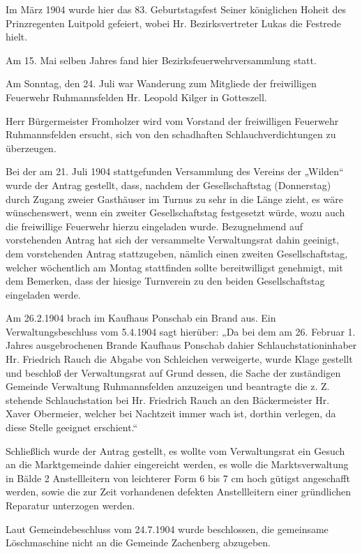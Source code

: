 Im März 1904 wurde hier das 83. Geburtstagsfest Seiner königlichen Hoheit des
Prinzregenten Luitpold gefeiert, wobei Hr. Bezirksvertreter Lukas die Festrede
hielt.

Am 15. Mai selben Jahres fand hier Bezirksfeuerwehrversammlung statt.

Am Sonntag, den 24. Juli war Wanderung zum Mitgliede der freiwilligen Feuerwehr
Ruhmannsfelden Hr. Leopold Kilger in Gotteszell.

Herr Bürgermeister Fromholzer wird vom Vorstand der freiwilligen Feuerwehr
Ruhmannsfelden ersucht, sich von den schadhaften Schlauchverdichtungen zu
überzeugen.

Bei der am 21. Juli 1904 stattgefunden Versammlung des Vereins der „Wilden“
wurde der Antrag gestellt, dass, nachdem der Gesellschaftstag (Donnerstag) durch
Zugang zweier Gasthäuser im Turnus zu sehr in die Länge zieht, es wäre
wünschenswert, wenn ein zweiter Gesellschaftstag festgesetzt würde, wozu auch
die freiwillige Feuerwehr hierzu eingeladen wurde. Bezugnehmend auf vorstehenden
Antrag hat sich der versammelte Verwaltungsrat dahin geeinigt, dem vorstehenden
Antrag stattzugeben, nämlich einen zweiten Gesellschaftstag, welcher wöchentlich
am Montag stattfinden sollte bereitwilligst genehmigt, mit dem Bemerken, dass
der hiesige Turnverein zu den beiden Gesellschaftstag eingeladen werde.

Am 26.2.1904 brach im Kaufhaus Ponschab ein Brand aus. Ein Verwaltungsbeschluss
vom 5.4.1904 sagt hierüber: „Da bei dem am 26. Februar 1. Jahres ausgebrochenen
Brande Kaufhaus Ponschab dahier Schlauchstationinhaber Hr. Friedrich Rauch die
Abgabe von Schleichen verweigerte, wurde Klage gestellt und beschloß der
Verwaltungsrat auf Grund dessen, die Sache der zuständigen Gemeinde Verwaltung
Ruhmannsfelden anzuzeigen und beantragte die z. Z. stehende Schlauchstation bei
Hr. Friedrich Rauch an den Bäckermeister Hr. Xaver Obermeier, welcher bei
Nachtzeit immer wach ist, dorthin verlegen, da diese Stelle geeignet erschient.“

Schließlich wurde der Antrag gestellt, es wollte vom Verwaltungsrat ein Gesuch
an die Marktgemeinde dahier eingereicht werden, es wolle die Marktsverwaltung in
Bälde 2 Anstellleitern von leichterer Form 6 bis 7 cm hoch gütigst angeschafft
werden, sowie die zur Zeit vorhandenen defekten Anstellleitern einer gründlichen
Reparatur unterzogen werden.

Laut Gemeindebeschluss vom 24.7.1904 wurde beschlossen, die gemeinsame
Löschmaschine nicht an die Gemeinde Zachenberg abzugeben.

